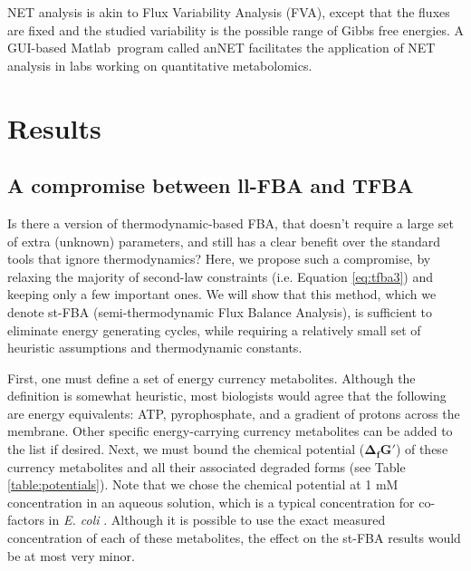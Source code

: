 \documentclass[twocolumn]{bmcart}%
\begin{document}
NET analysis is akin to Flux Variability Analysis (FVA), except that the fluxes are fixed and the studied variability is the possible range of Gibbs free energies. A GUI-based Matlab\texttrademark~program called anNET \cite{Zamboni2008} facilitates the application of NET analysis in labs working on quantitative metabolomics.

\section*{Results}

\subsection*{A compromise between ll-FBA and TFBA}
Is there a version of thermodynamic-based FBA, that doesn't require a large set of extra (unknown) parameters, and still has a clear benefit over the standard tools that ignore thermodynamics? Here, we propose such a compromise, by relaxing the majority of second-law constraints (i.e. Equation \ref{eq:tfba3}) and keeping only a few important ones. We will show that this method, which we denote st-FBA (semi-thermodynamic Flux Balance Analysis), is sufficient to eliminate energy generating cycles, while requiring a relatively small set of heuristic assumptions and thermodynamic constants.

First, one must define a set of energy currency metabolites. Although the definition is somewhat heuristic, most biologists would agree that the following are energy equivalents: ATP, pyrophosphate, and a gradient of protons across the membrane. Other specific energy-carrying currency metabolites can be added to the list if desired. Next, we must bound the chemical potential ($\mathbf{\Delta_f G'}$) of these currency metabolites and all their associated degraded forms (see Table \ref{table:potentials}). Note that we chose the chemical potential at 1 mM concentration in an aqueous solution, which is a typical concentration for co-factors in \emph{E. coli} \cite{Bennett2009-rm}. Although it is possible to use the exact measured concentration of each of these metabolites, the effect on the st-FBA results would be at most very minor. 
\end{document}
